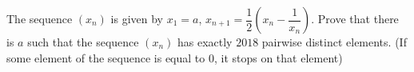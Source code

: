 The sequence $(x_n)$ is given by $x_1=a$,  $x_{n+1}=\dfrac{1}{2}\left(x_n-\dfrac{1}{x_n}\right)$. Prove that there is $a$ such that the sequence $(x_n)$ has exactly $2018$ pairwise distinct elements. (If some element of the sequence is equal to $0$,  it stops on that element)